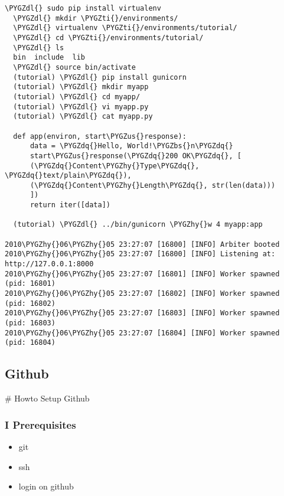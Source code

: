 \documentclass[letterpaper,10pt,english]{sphinxmanual}
\def\PYGZbs{\char`\\}
\def\PYGZus{\char`\_}
\def\PYGZdl{\char`\$}
\def\PYGZhy{\char`\-}
\def\PYGZdq{\char`\"}
\def\PYGZti{\char`\~}
\begin{document}
\begin{Verbatim}[commandchars=\\\{\}]
  \PYGZdl{} sudo pip install virtualenv
  \PYGZdl{} mkdir \PYGZti{}/environments/
  \PYGZdl{} virtualenv \PYGZti{}/environments/tutorial/
  \PYGZdl{} cd \PYGZti{}/environments/tutorial/
  \PYGZdl{} ls
  bin  include  lib
  \PYGZdl{} source bin/activate
  (tutorial) \PYGZdl{} pip install gunicorn
  (tutorial) \PYGZdl{} mkdir myapp
  (tutorial) \PYGZdl{} cd myapp/
  (tutorial) \PYGZdl{} vi myapp.py
  (tutorial) \PYGZdl{} cat myapp.py

  def app(environ, start\PYGZus{}response):
      data = \PYGZdq{}Hello, World!\PYGZbs{}n\PYGZdq{}
      start\PYGZus{}response(\PYGZdq{}200 OK\PYGZdq{}, [
      (\PYGZdq{}Content\PYGZhy{}Type\PYGZdq{}, \PYGZdq{}text/plain\PYGZdq{}),
      (\PYGZdq{}Content\PYGZhy{}Length\PYGZdq{}, str(len(data)))
      ])
      return iter([data])

  (tutorial) \PYGZdl{} ../bin/gunicorn \PYGZhy{}w 4 myapp:app

2010\PYGZhy{}06\PYGZhy{}05 23:27:07 [16800] [INFO] Arbiter booted 
2010\PYGZhy{}06\PYGZhy{}05 23:27:07 [16800] [INFO] Listening at: http://127.0.0.1:8000 
2010\PYGZhy{}06\PYGZhy{}05 23:27:07 [16801] [INFO] Worker spawned (pid: 16801) 
2010\PYGZhy{}06\PYGZhy{}05 23:27:07 [16802] [INFO] Worker spawned (pid: 16802) 
2010\PYGZhy{}06\PYGZhy{}05 23:27:07 [16803] [INFO] Worker spawned (pid: 16803) 
2010\PYGZhy{}06\PYGZhy{}05 23:27:07 [16804] [INFO] Worker spawned (pid: 16804)
\end{Verbatim}


\subsection{Github}
\label{sdocs/github/github:github}\label{sdocs/github/github::doc}
\# Howto Setup Github


\subsubsection{I Prerequisites}
\label{sdocs/github/github:i-prerequisites}\begin{itemize}
\item {} 
git

\item {} 
ssh

\item {} 
login on github

\end{itemize}
\end{document}

